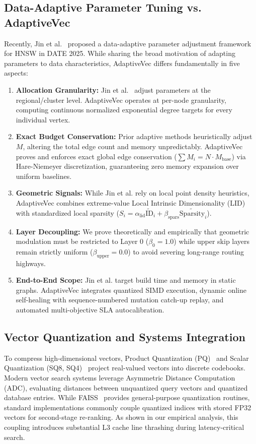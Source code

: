 \documentclass[10pt,journal,compsoc]{IEEEtran}
\begin{document}
\subsection{Data-Adaptive Parameter Tuning vs. AdaptiveVec}
Recently, Jin et al.~\cite{jin2025efficient} proposed a data-adaptive parameter adjustment framework for HNSW in DATE 2025. While sharing the broad motivation of adapting parameters to data characteristics, AdaptiveVec differs fundamentally in five aspects:
\begin{enumerate}
    \item \textbf{Allocation Granularity:} Jin et al.~\cite{jin2025efficient} adjust parameters at the regional/cluster level. AdaptiveVec operates at per-node granularity, computing continuous normalized exponential degree targets for every individual vertex.
    \item \textbf{Exact Budget Conservation:} Prior adaptive methods heuristically adjust $M$, altering the total edge count and memory unpredictably. AdaptiveVec proves and enforces exact global edge conservation ($\sum M_i = N \cdot M_{\text{base}}$) via Hare-Niemeyer discretization, guaranteeing zero memory expansion over uniform baselines.
    \item \textbf{Geometric Signals:} While Jin et al. rely on local point density heuristics, AdaptiveVec combines extreme-value Local Intrinsic Dimensionality (LID)~\cite{levina2004maximum, houle2017local} with standardized local sparsity ($S_i = \alpha_{\text{lid}}\tilde{\text{ID}}_i + \beta_{\text{spars}}\tilde{\text{Sparsity}}_i$).
    \item \textbf{Layer Decoupling:} We prove theoretically and empirically that geometric modulation must be restricted to Layer 0 ($\beta_0 = 1.0$) while upper skip layers remain strictly uniform ($\beta_{\text{upper}} = 0.0$) to avoid severing long-range routing highways.
    \item \textbf{End-to-End Scope:} Jin et al. target build time and memory in static graphs. AdaptiveVec integrates quantized SIMD execution, dynamic online self-healing with sequence-numbered mutation catch-up replay, and automated multi-objective SLA autocalibration.
\end{enumerate}

\subsection{Vector Quantization and Systems Integration}
To compress high-dimensional vectors, Product Quantization (PQ)~\cite{jegou2011product} and Scalar Quantization (SQ8, SQ4)~\cite{johnson2021billion, gray1998quantization} project real-valued vectors into discrete codebooks. Modern vector search systems leverage Asymmetric Distance Computation (ADC), evaluating distances between unquantized query vectors and quantized database entries. While FAISS~\cite{johnson2021billion} provides general-purpose quantization routines, standard implementations commonly couple quantized indices with stored FP32 vectors for second-stage re-ranking. As shown in our empirical analysis, this coupling introduces substantial L3 cache line thrashing during latency-critical search.
\end{document}
